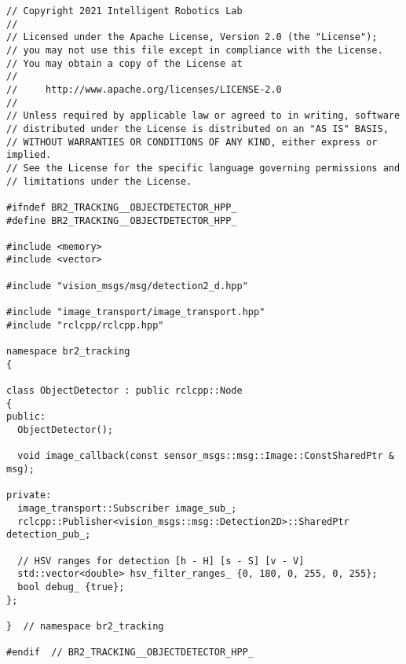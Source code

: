  \footnotesize
\begin{tcolorbox}[sharp corners, colframe=gray!80, colback=LightGray, left=0pt, top=0pt, bottom=0pt, title=\texttt{br2\_tracking/include/br2\_tracking/ObjectDetector.hpp}]
  \begin{verbatim}
// Copyright 2021 Intelligent Robotics Lab
//
// Licensed under the Apache License, Version 2.0 (the "License");
// you may not use this file except in compliance with the License.
// You may obtain a copy of the License at
//
//     http://www.apache.org/licenses/LICENSE-2.0
//
// Unless required by applicable law or agreed to in writing, software
// distributed under the License is distributed on an "AS IS" BASIS,
// WITHOUT WARRANTIES OR CONDITIONS OF ANY KIND, either express or implied.
// See the License for the specific language governing permissions and
// limitations under the License.

#ifndef BR2_TRACKING__OBJECTDETECTOR_HPP_
#define BR2_TRACKING__OBJECTDETECTOR_HPP_

#include <memory>
#include <vector>

#include "vision_msgs/msg/detection2_d.hpp"

#include "image_transport/image_transport.hpp"
#include "rclcpp/rclcpp.hpp"

namespace br2_tracking
{

class ObjectDetector : public rclcpp::Node
{
public:
  ObjectDetector();

  void image_callback(const sensor_msgs::msg::Image::ConstSharedPtr & msg);

private:
  image_transport::Subscriber image_sub_;
  rclcpp::Publisher<vision_msgs::msg::Detection2D>::SharedPtr detection_pub_;

  // HSV ranges for detection [h - H] [s - S] [v - V]
  std::vector<double> hsv_filter_ranges_ {0, 180, 0, 255, 0, 255};
  bool debug_ {true};
};

}  // namespace br2_tracking

#endif  // BR2_TRACKING__OBJECTDETECTOR_HPP_
    \end{verbatim}
    \end{tcolorbox}
  \normalsize

